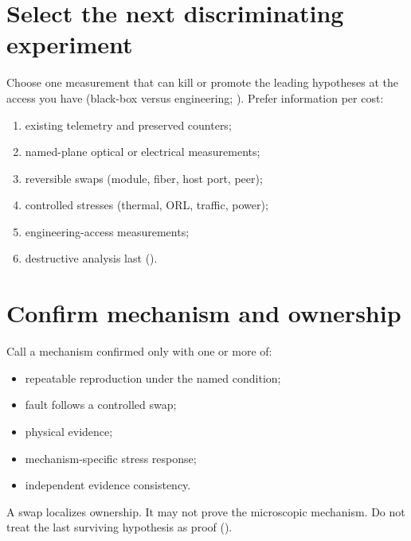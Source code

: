 
\section{Select the next discriminating experiment}
\label{sec:fa-experiment}

Choose one measurement that can kill or promote the leading hypotheses at the
access you have (black-box versus engineering;
). Prefer information
per cost:

\begin{enumerate}
\item existing telemetry and preserved counters;
\item named-plane optical or electrical measurements;
\item reversible swaps (module, fiber, host port, peer);
\item controlled stresses (thermal, ORL, traffic, power);
\item engineering-access measurements;
\item destructive analysis last ().
\end{enumerate}


\section{Confirm mechanism and ownership}
\label{sec:fa-confirm}

Call a mechanism confirmed only with one or more of:

\begin{itemize}
\item repeatable reproduction under the named condition;
\item fault follows a controlled swap;
\item physical evidence;
\item mechanism-specific stress response;
\item independent evidence consistency.
\end{itemize}

A swap localizes ownership. It may not prove the microscopic mechanism. Do not
treat the last surviving hypothesis as proof
().

